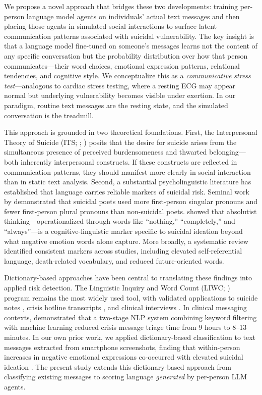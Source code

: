 \documentclass[review,12pt,authoryear]{elsarticle}
\begin{document}
We propose a novel approach that bridges these two developments: training per-person language model agents on individuals' actual text messages and then placing those agents in simulated social interactions to surface latent communication patterns associated with suicidal vulnerability. The key insight is that a language model fine-tuned on someone's messages learns not the content of any specific conversation but the probability distribution over how that person communicates---their word choices, emotional expression patterns, relational tendencies, and cognitive style. We conceptualize this as a \textit{communicative stress test}---analogous to cardiac stress testing, where a resting ECG may appear normal but underlying vulnerability becomes visible under exertion. In our paradigm, routine text messages are the resting state, and the simulated conversation is the treadmill.

This approach is grounded in two theoretical foundations. First, the Interpersonal Theory of Suicide (ITS; \citealt{joiner2005why}; \citealt{vanorden2010interpersonal}) posits that the desire for suicide arises from the simultaneous presence of perceived burdensomeness and thwarted belonging---both inherently interpersonal constructs. If these constructs are reflected in communication patterns, they should manifest more clearly in social interaction than in static text analysis. Second, a substantial psycholinguistic literature has established that language carries reliable markers of suicidal risk. Seminal work by \citet{stirman2001word} demonstrated that suicidal poets used more first-person singular pronouns and fewer first-person plural pronouns than non-suicidal poets. \citet{almosaiwi2018absolute} showed that absolutist thinking---operationalized through words like ``nothing,'' ``completely,'' and ``always''---is a cognitive-linguistic marker specific to suicidal ideation beyond what negative emotion words alone capture. More broadly, a systematic review \citep{ophir2022linguistic} identified consistent markers across studies, including elevated self-referential language, death-related vocabulary, and reduced future-oriented words.

Dictionary-based approaches have been central to translating these findings into applied risk detection. The Linguistic Inquiry and Word Count (LIWC; \citealt{pennebaker2015development}) program remains the most widely used tool, with validated applications to suicide notes \citep{pestian2012sentiment}, crisis hotline transcripts \citep{huang2024mindsets}, and clinical interviews \citep{tausczik2010psychological}. In clinical messaging contexts, \citet{swaminathan2023nlp} demonstrated that a two-stage NLP system combining keyword filtering with machine learning reduced crisis message triage time from 9 hours to 8--13 minutes. In our own prior work, we applied dictionary-based classification to text messages extracted from smartphone screenshots, finding that within-person increases in negative emotional expressions co-occurred with elevated suicidal ideation \citep{ammerman2026beyond}. The present study extends this dictionary-based approach from classifying existing messages to scoring language \textit{generated} by per-person LLM agents.
\end{document}
